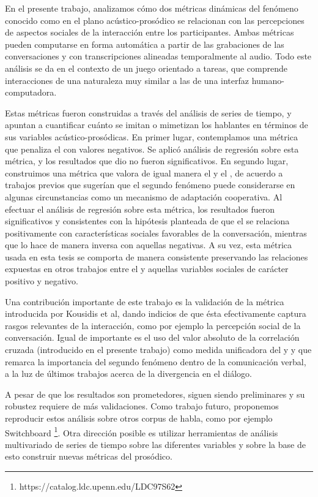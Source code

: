 En el presente trabajo, analizamos cómo dos métricas dinámicas del fenómeno conocido como \entrainment en el plano acústico-prosódico se relacionan con las percepciones de aspectos sociales de la interacción entre los participantes. Ambas métricas pueden computarse en forma automática a partir de las grabaciones de las conversaciones y con transcripciones  alineadas temporalmente al audio. Todo este análisis se da en el contexto de un juego orientado a tareas, que comprende interacciones de una naturaleza muy similar a las de una interfaz humano-computadora.

Estas métricas fueron construidas a través del análisis de series de tiempo, y apuntan a cuantificar cuánto se imitan o mimetizan los hablantes en términos de sus variables acústico-prosódicas. En primer lugar, contemplamos una métrica que penaliza el \disentrainment con valores negativos. Se aplicó análisis de regresión sobre esta métrica, y los resultados que dio no fueron significativos. En segundo lugar, construimos una métrica que valora de igual manera el \entrainment y el \disentrainment, de acuerdo a trabajos previos que sugerían que el segundo fenómeno puede considerarse en algunas circunstancias como un mecanismo de adaptación cooperativa. Al efectuar el análisis de regresión sobre esta métrica, los resultados fueron significativos y consistentes con la hipótesis planteada de que el \entrainment se relaciona positivamente con características sociales favorables de la conversación, mientras que lo hace de manera inversa con aquellas negativas. A su vez, esta métrica usada en esta tesis se comporta de manera consistente preservando las relaciones expuestas en otros trabajos entre el \entrainment y aquellas variables sociales de carácter positivo y negativo.

Una contribución importante de este trabajo es la validación de la métrica introducida por Kousidis et al\cite{KOU2008.2}, dando indicios de que ésta efectivamente captura rasgos relevantes de la interacción, como por ejemplo la percepción social de la conversación. Igual de importante es el uso del valor absoluto de la correlación cruzada (introducido en el presente trabajo) como medida unificadora del \entrainment y \disentrainment y que remarca la importancia del segundo fenómeno dentro de la comunicación verbal, a la luz de últimos trabajos acerca de la divergencia en el diálogo.

A pesar de que los resultados son prometedores, siguen siendo preliminares y su robustez requiere de más validaciones. Como trabajo futuro, proponemos reproducir estos análisis sobre otros corpus de habla, como por ejemplo Switchboard \footnote{https://catalog.ldc.upenn.edu/LDC97S62}. Otra dirección posible es utilizar herramientas de análisis multivariado de series de tiempo sobre las diferentes variables \ap y sobre la base de esto construir nuevas métricas del \entrainment prosódico.
